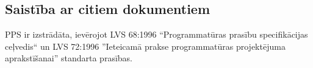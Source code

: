 \subsection*{Saistība ar citiem dokumentiem}
PPS ir izstrādāta, ievērojot LVS 68:1996 ``Programmatūras prasību
specifikācijas ceļvedis`` un LVS 72:1996 ''Ieteicamā prakse programmatūras
projektējuma aprakstīšanai” standarta prasības.
